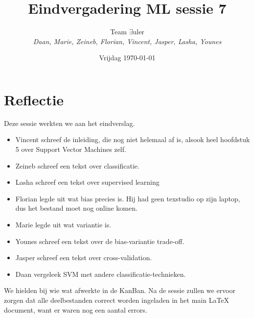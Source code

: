 \documentclass{article}
\title{Eindvergadering ML sessie 7}
\author{Team $\exists$uler\\
	\textit{Daan, Marie, Zeineb, Florian, Vincent, Jasper, Lasha, Younes}}
\date{Vrijdag \today}
\begin{document}
	
\maketitle

\section*{Reflectie}

Deze sessie werkten we aan het eindverslag.

\begin{itemize}
	\item Vincent schreef de inleiding, die nog niet helemaal af is, alsook heel hoofdstuk 5 over Support Vector Machines zelf.
	\item Zeineb schreef een tekst over classificatie.
	\item Lasha schreef een tekst over supervised learning
	\item Florian legde uit wat bias precies is. Hij had geen texstudio op zijn laptop, dus het bestand moet nog online komen. 
	\item Marie legde uit wat variantie is.
	\item Younes schreef een tekst over de bias-variantie trade-off.
	\item Jasper schreef een tekst over cross-validation.
	\item Daan vergeleek SVM met andere classificatie-technieken.
\end{itemize}

We hielden bij wie wat afwerkte in de KanBan.
Na de sessie zullen we ervoor zorgen dat alle deelbestanden correct worden ingeladen in het main LaTeX document, want er waren nog een aantal errors.
\end{document}
